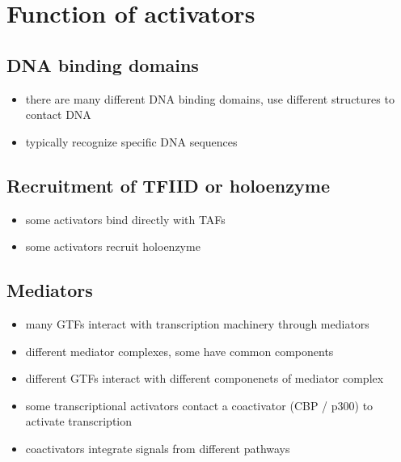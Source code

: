 \documentclass[10pt]{article}
\newenvironment{mitemize}
{
  \begin{itemize}
  \setlength{\itemsep}{1pt}
  \setlength{\parskip}{0pt}
  \setlength{\parsep}{0pt}}{\end{itemize}
}
\begin{document}
\section*{Function of activators}

\subsection*{DNA binding domains}
\begin{mitemize}
  \item there are many different DNA binding domains, use different structures to contact DNA
  \item typically recognize specific DNA sequences
\end{mitemize}

\subsection*{Recruitment of TFIID or holoenzyme}
\begin{mitemize}
  \item some activators bind directly with TAFs
  \item some activators recruit holoenzyme
\end{mitemize}

\subsection*{Mediators}
\begin{mitemize}
  \item many GTFs interact with transcription machinery through mediators
  \item different mediator complexes, some have common components
  \item different GTFs interact with different componenets of mediator complex
  \item some transcriptional activators contact a coactivator (CBP / p300) to activate transcription
  \item coactivators integrate signals from different pathways
\end{mitemize}
\end{document}
